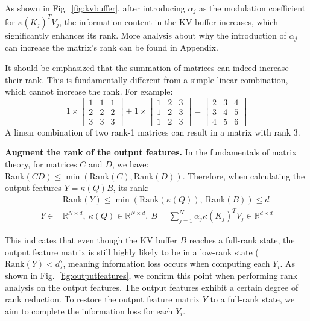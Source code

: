 \documentclass[10pt,twocolumn,letterpaper]{article}
\begin{document}
As shown in Fig.~\ref{fig:kvbuffer}, after introducing $\alpha_j$ as the modulation coefficient for $\kappa(K_j)^T V_j$, the information content in the KV buffer increases, which significantly enhances its rank. More analysis about why the introduction of $\alpha_j$ can increase the matrix's rank can be found in Appendix.

It should be emphasized that the summation of matrices can indeed increase their rank. This is fundamentally different from a simple linear combination, which cannot increase the rank. For example:
\[
1 \times \begin{bmatrix} 1 & 1 & 1 \\ 2 & 2 & 2 \\ 3 & 3 & 3 \end{bmatrix} + 1 \times \begin{bmatrix} 1 & 2 & 3 \\ 1 & 2 & 3 \\ 1 & 2 & 3 \end{bmatrix} = \begin{bmatrix} 2 & 3 & 4 \\ 3 & 4 & 5 \\ 4 & 5 & 6 \end{bmatrix}
\]
A linear combination of two rank-1 matrices can result in a matrix with rank 3.

\textbf{Augment the rank of the output features.} In the fundamentals of matrix theory, for matrices $C$ and $D$, we have: $\mathrm{Rank}(CD) \leq \min(\mathrm{Rank}(C), \mathrm{Rank}(D))$. Therefore, when calculating the output features $Y = \kappa(Q)B$, its rank:
\begin{equation}
\begin{aligned}
&\mathrm{Rank}(Y) \leq \min(\mathrm{Rank}(\kappa(Q)),\ \mathrm{Rank}(B)) \leq d \\
Y \in &\mathbb{R}^{N \times d},\ \kappa(Q) \in \mathbb{R}^{N \times d},\ B = \sum_{j=1}^{N} \alpha_j \kappa(K_j)^T V_j \in \mathbb{R}^{d \times d}
\end{aligned}
\label{eq:rankbound}
\end{equation}

This indicates that even though the KV buffer $B$ reaches a full-rank state, the output feature matrix is still highly likely to be in a low-rank state ($\mathrm{Rank}(Y) < d$), meaning information loss occurs when computing each $Y_i$. As shown in Fig.~\ref{fig:outputfeatures}, we confirm this point when performing rank analysis on the output features. The output features exhibit a certain degree of rank reduction. To restore the output feature matrix $Y$ to a full-rank state, we aim to complete the information loss for each $Y_i$.
\end{document}
